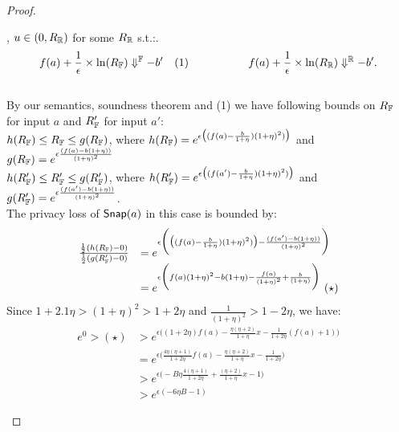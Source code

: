 \documentclass[a4paper,11pt]{article}
\begin{document}
\begin{proof}
\begin{itemize}
		, $u \in (0, R_{\mathbb{R}})$ for some $R_{\mathbb{R}}$ s.t.:.
		$$f(a) + \frac{1}{\epsilon} \times \ln(R_{\mathbb{F}}) \Downarrow^{\mathbb{F}} -b' ~~~ (1)
		~~~~~~~~~~~~~~~~
		f(a) + \frac{1}{\epsilon} \times \ln(R_{\mathbb{R}}) \Downarrow^{\mathbb{R}} -b'.
		$$
		\\
		By our semantics, soundness theorem and (1) we have following bounds on $R_{\mathbb{F}}$ for input $a$ and $R_{\mathbb{F}}'$ for input $a'$:
		\\
		$h(R_{\mathbb{F}}) \leq R_{\mathbb{F}} \leq g(R_{\mathbb{F}})$, where
		$h(R_{\mathbb{F}}) = e^{\epsilon 
		\big( (f(a) -  \frac{b}{1 + \eta}) (1 + \eta)^2) \big)}$
		and
		$g(R_{\mathbb{F}}) = e^{\epsilon 
		\frac{(f(a) - b(1 + \eta))}{(1 + \eta)^2}}$
		\\
		$h(R_{\mathbb{F}}') \leq R_{\mathbb{F}}' \leq g(R_{\mathbb{F}}')$, where
		$h(R_{\mathbb{F}}') = e^{\epsilon 
		\big( (f(a') -  \frac{b}{1 + \eta}) (1 + \eta)^2) \big)}$
		and
		$g(R_{\mathbb{F}}') = e^{\epsilon 
		\frac{(f(a') - b(1 + \eta))}{(1 + \eta)^2}}$.
		\\
		The privacy loss of $\mathsf{Snap}(a)$ in this case is bounded by:
		\[
		\begin{array}{ll}
		\frac
		{\frac{1}{2}(h(\fvalR) - 0)}
		{\frac{1}{2}(g(\fvalR') - 0)}
		& = e^{\epsilon
		\bigg(
		\big( (f(a) -  \frac{b}{1 + \eta}) (1 + \eta)^2) \big)
		-
		\frac{(f(a') - b(1 + \eta))}{(1 + \eta)^2}
		\bigg)}\\
		& = e^{\epsilon
		\bigg(
		f(a)(1 + \eta)^2 - b(1 + \eta) 
		- \frac{f(a)}{(1 + \eta)^2} + \frac{b}{(1 + \eta)}   
		\bigg)} ~ (\star)
		\end{array}
		\]
		Since $ 1 + 2.1\eta > (1 + \eta)^2 > 1 + 2\eta$ and $\frac{1}{(1 + \eta)^2} > 1 - 2 \eta$, we have:
		\[
		\begin{array}{ll}
		e^0 > (\star) & > e^{\epsilon \big(
		(1 + 2\eta) f(a) - \frac{\eta(\eta + 2)}{1 + \eta} x
		- \frac{1}{1 + 2\eta}(f(a) + 1)
		\big)}\\
		& = e^{\epsilon\big(
		\frac{4\eta(\eta + 1)}{1 + 2\eta} f(a) 
		- \frac{\eta(\eta + 2)}{1 + \eta} x
		- \frac{1}{1 + 2\eta}		
		\big)}\\
		& > e^{\epsilon\big( -B \eta
		\frac{4(\eta + 1)}{1 + 2\eta} + \frac{(\eta + 2)}{1 + \eta} x - 1	
		\big)}\\
%
		& > e^{\epsilon(-6 \eta B - 1)}
		\end{array}
		\]
	\end{itemize}
\end{proof}




\newpage


\end{document}
